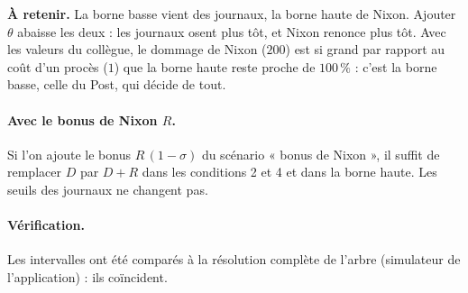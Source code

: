 \documentclass[11pt,a4paper]{article}
\theoremstyle{definition}
\begin{document}
\begin{simple}
\textbf{À retenir.} La borne basse vient des journaux, la borne haute de Nixon. Ajouter $\theta$ abaisse les deux : les journaux osent plus tôt, et Nixon renonce plus tôt. Avec les valeurs du collègue, le dommage de Nixon ($200$) est si grand par rapport au coût d'un procès ($1$) que la borne haute reste proche de $100\,\%$ : c'est la borne basse, celle du Post, qui décide de tout.
\end{simple}

\paragraph{Avec le bonus de Nixon $R$.} Si l'on ajoute le bonus $R\,(1-\sigma)$ du scénario « bonus de Nixon », il suffit de remplacer $D$ par $D+R$ dans les conditions 2 et 4 et dans la borne haute. Les seuils des journaux ne changent pas.

\paragraph{Vérification.} Les intervalles ont été comparés à la résolution complète de l'arbre (simulateur de l'application) : ils coïncident.
\end{document}
